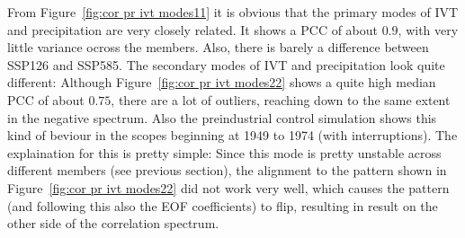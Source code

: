 From Figure~\ref{fig:cor pr ivt modes11} it is obvious that the primary modes of IVT and precipitation are very closely related. 
It shows a PCC of about $0.9$, with very little variance ocross the members. 
Also, there is barely a difference between SSP126 and SSP585. 
The secondary modes of IVT and precipitation look quite different: 
Although Figure~\ref{fig:cor pr ivt modes22} shows a quite high median PCC of about $0.75$, there are a lot of outliers, reaching down to the same extent in the negative spectrum. 
Also the preindustrial control simulation shows this kind of beviour in the scopes beginning at 1949 to 1974 (with interruptions). 
The explaination for this is pretty simple: Since this mode is pretty unstable across different members (see previous section), the alignment to the pattern shown in Figure~\ref{fig:cor pr ivt modes22} did not work very well, which causes the pattern (and following this also the EOF coefficients) to flip, resulting in result on the other side of the correlation spectrum. 



